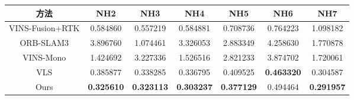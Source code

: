 \begin{table}
\centering
\begin{tabular}{ccccccc}
\toprule
\textbf{方法}       & \textbf{NH2}      & \textbf{NH3}      & \textbf{NH4}      & \textbf{NH5}      & \textbf{NH6}      & \textbf{NH7}      \\ \midrule
VINS-Fusion+RTK & 0.584860          & 0.557219          & 0.584881          & 0.708736          & 0.764223          & 1.098182          \\
ORB-SLAM3       & 3.896760          & 1.074461          & 3.326053          & 2.883349          & 4.258630          & 1.770878          \\
VINS-Mono       & 1.424692          & 3.227336          & 1.526516          & 2.821233          & 3.874702          & 1.720061          \\
VLS             & 0.385877          & 0.338285          & 0.336795          & 0.409525          & \cellcolor[HTML]{FA7F6F}\textbf{0.463320} & 0.304587          \\
Ours            & \cellcolor[HTML]{FA7F6F}\textbf{0.325610} & \cellcolor[HTML]{FA7F6F}\textbf{0.323113} & \cellcolor[HTML]{FA7F6F}\textbf{0.303237} & \cellcolor[HTML]{FA7F6F}\textbf{0.377129} & 0.494464          & \cellcolor[HTML]{FA7F6F}\textbf{0.291957} \\ \bottomrule
\end{tabular}
\end{table}